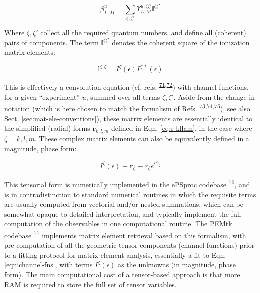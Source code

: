 \documentclass[10pt]{article}
\begin{document}
\begin{equation}
\beta_{L,M}^{u}=\sum_{\zeta,\zeta'}\varUpsilon_{L,M}^{u,\zeta\zeta'}\mathbb{I}^{\zeta\zeta'}\label{eqn:channel-fns}
\end{equation}


Where $\zeta,\zeta'$ collect all the required quantum numbers, and define all (coherent) pairs of components. The term $\mathbb{I}^{\zeta\zeta'}$ denotes the coherent square of the ionization matrix elements:

\begin{equation}
\mathbb{I}^{\zeta,\zeta}=I^{\zeta}(\epsilon)I^{\zeta'*}(\epsilon)
\label{eqn:I-zeta}
\end{equation}

This is effectively a convolution equation (cf. refs. \textsuperscript{\hyperref[csl:71]{71},\hyperref[csl:72]{72}}) with channel functions, for a given ``experiment'' $u$, summed over all terms $\zeta,\zeta'$. Aside from the change in notation (which is here chosen to match the formalism of Refs. \textsuperscript{\hyperref[csl:73]{73},\hyperref[csl:74]{74},\hyperref[csl:75]{75}}), see also Sect. \ref{sec:mat-ele-conventions}), these matrix elements are essentially identical to the simplified (radial) forms $\mathbf{r}_{k,l,m}$ defined in Eqn. \ref{eq:r-kllam}, in the case where $\zeta=k,l,m$. These complex matrix elements can also be equivalently defined in a magnitude, phase form:

\begin{equation}
I^{\zeta}(\epsilon)\equiv\mathbf{r}_{\zeta}\equiv r_{\zeta}e^{i\phi_{\zeta}}
\end{equation}


This tensorial form is numerically implemented in the ePSproc codebase \textsuperscript{\hyperref[csl:76]{76}}, and is in contradistinction to standard numerical routines in which the requisite terms are usually computed from vectorial and/or nested summations, which can be somewhat opaque to detailed interpretation, and typically implement the full computation of the observables in one computational routine. The PEMtk codebase \textsuperscript{\hyperref[csl:77]{77}} implements matrix element retrieval based on this formalism, with pre-computation of all the geometric tensor components (channel functions) prior to a fitting protocol for matrix element analysis, essentially a fit to Eqn. \ref{eqn:channel-fns}, with terms $I^{\zeta}(\epsilon)$ as the unknowns (in magnitude, phase form). The main computational cost of a tensor-based approach is that more RAM is required to store the full set of tensor variables.
\end{document}
